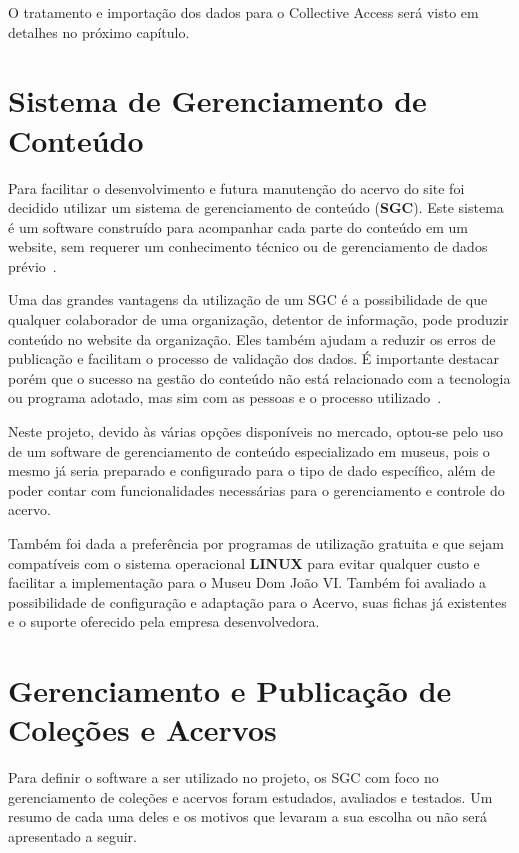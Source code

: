 \documentclass[a4paper,12pt,oneside,onecolumn,final,fleqn]{repUERJ}
\begin{document}
O tratamento e importação dos dados para o Collective Access será visto em detalhes no próximo capítulo.

\section{Sistema de Gerenciamento de Conteúdo}

Para facilitar o desenvolvimento e futura manutenção do acervo do site foi decidido utilizar um sistema de gerenciamento de conteúdo (\textbf{SGC}). Este sistema é um software construído para acompanhar cada parte do conteúdo em um website, sem requerer um conhecimento técnico ou de gerenciamento de dados prévio~\cite{CMS}.

Uma das grandes vantagens da utilização de um SGC é a possibilidade de que qualquer colaborador de uma organização, detentor de informação, pode produzir conteúdo no website da organização. Eles também ajudam a reduzir os erros de publicação e facilitam o processo de validação dos dados. É importante destacar porém que o sucesso na gestão do conteúdo não está relacionado com a tecnologia ou programa adotado, mas sim com as pessoas e o processo utilizado~\cite{chagas2018estudo}.


Neste projeto, devido às várias opções disponíveis no mercado, optou-se pelo uso de um software de gerenciamento de conteúdo especializado em museus, pois o mesmo já seria preparado e configurado para o tipo de dado específico, além de poder contar com funcionalidades necessárias para o gerenciamento e controle do acervo.

Também foi dada a preferência por programas de utilização gratuita e que sejam compatíveis com o sistema operacional \textbf{LINUX} para evitar qualquer custo e facilitar a implementação para o Museu Dom João VI. Também foi avaliado a possibilidade de configuração e adaptação para o Acervo, suas fichas já existentes e o suporte oferecido pela empresa desenvolvedora.

\section{Gerenciamento e Publicação de Coleções e Acervos}

Para definir o software a ser utilizado no projeto, os SGC com foco no gerenciamento de coleções e acervos foram estudados, avaliados e testados. Um resumo de cada uma deles e os motivos que levaram a sua escolha ou não será apresentado a seguir.
\end{document}
